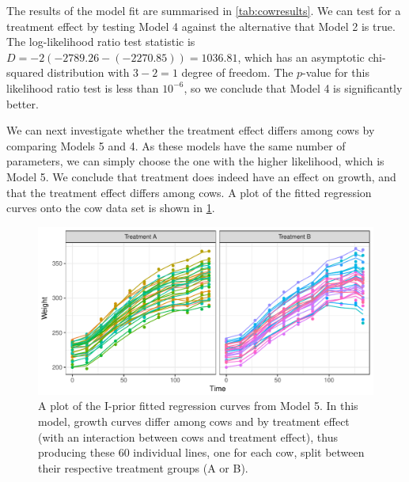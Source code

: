 \documentclass[showframe,11pt,twoside,openright]{report}\usepackage[]{graphicx}\usepackage{xcolor}
\makeatletter
\def\maxwidth{ %
  \ifdim\Gin@nat@width>\linewidth
    \linewidth
  \else
    \Gin@nat@width
  \fi
}
\newenvironment{kframe}{%
 \def\at@end@of@kframe{}%
 \ifinner\ifhmode%
  \def\at@end@of@kframe{\end{minipage}}%
  \begin{minipage}{\columnwidth}%
 \fi\fi%
 \def\FrameCommand##1{\hskip\@totalleftmargin \hskip-\fboxsep
 \colorbox{shadecolor}{##1}\hskip-\fboxsep
     \hskip-\linewidth \hskip-\@totalleftmargin \hskip\columnwidth}%
 \MakeFramed {\advance\hsize-\width
   \@totalleftmargin\z@ \linewidth\hsize
   \@setminipage}}%
 {\par\unskip\endMakeFramed%
 \at@end@of@kframe}
\newenvironment{knitrout}{}{} %
\makeatother
\begin{document}
The results of the model fit are summarised in \cref{tab:cowresults}. We can test for a treatment effect by testing Model 4 against the alternative that Model 2 is true.
The log-likelihood ratio test statistic is
$D = -2(-2789.26 - (-2270.85)) = 1036.81$, which has an asymptotic chi-squared distribution with $3 - 2 = 1$ degree of freedom.
The $p$-value for this likelihood ratio test is less than $10^{-6}$, so we conclude that Model 4 is significantly better.

We can next investigate whether the treatment effect differs among cows by comparing Models 5 and 4.
As these models have the same number of parameters, we can simply choose the one with the higher likelihood, which is Model 5.
We conclude that treatment does indeed have an effect on growth, and that the treatment effect differs among cows.
A plot of the fitted regression curves onto the cow data set is shown in \cref{fig:cows.plot}.

\begin{knitrout}
\color{fgcolor}\begin{kframe}
\singlespacing\end{kframe}\begin{figure}[htb]

{\centering \includegraphics[width=\maxwidth]{figure/04-cows_plot-1} 

}

\caption[A plot of the I-prior fitted regression curves from Model 5]{A plot of the I-prior fitted regression curves from Model 5. In this model, growth curves differ among cows and by treatment effect (with an interaction between cows and treatment effect), thus producing these 60 individual lines, one for each cow, split between their respective treatment groups (A or B).}\label{fig:cows.plot}
\end{figure}


\end{knitrout}
\end{document}

